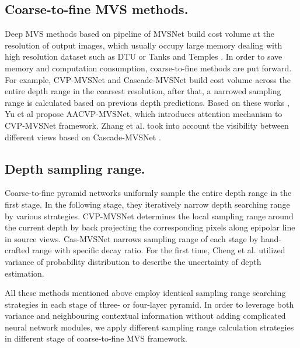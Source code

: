 \documentclass{article}
\begin{document}
\subsection{Coarse-to-fine MVS methods.}
Deep MVS methods \cite{yao2018mvsnet,yao2019recurrent} based on pipeline of MVSNet \cite{yao2018mvsnet} build cost volume at the resolution of output images, which usually occupy large memory dealing with high resolution dataset such as DTU \cite{aanaes2016large} or Tanks and Temples \cite{knapitsch2017tanks}.
In order to save memory and computation consumption, coarse-to-fine methods \cite{yu2020fast,yang2020cost,gu2020cascade}are put forward.
For example, CVP-MVSNet \cite{yang2020cost} and Cascade-MVSNet \cite{gu2020cascade} build cost volume across the entire depth range in the coarsest resolution, after that, a narrowed sampling range is calculated based on previous depth predictions.
Based on these works \cite{yang2020cost,gu2020cascade}, Yu et al \cite{yu2021attention} propose AACVP-MVSNet, which introduces attention mechanism to CVP-MVSNet \cite{yang2020cost} framework.
Zhang et al. \cite{zhang2020visibility} took into account the visibility between different views based on Cascade-MVSNet \cite{gu2020cascade}.

\subsection{Depth sampling range.}
Coarse-to-fine pyramid networks uniformly sample the entire depth range in the first stage.
In the following stage, they iteratively narrow depth searching range by various strategies.
CVP-MVSNet \cite{yang2020cost} determines the local sampling range around the current depth by back projecting the corresponding pixels along epipolar line in source views.
Cas-MVSNet \cite{gu2020cascade} narrows sampling range of each stage by hand-crafted range with specific decay ratio.
For the first time, Cheng et al. \cite{cheng2020deep} utilized variance of probability distribution to describe the uncertainty of depth estimation.

All these methods mentioned above employ identical sampling range searching strategies in each stage of three- or four-layer pyramid.
In order to leverage both variance and neighbouring contextual information without adding complicated neural network modules, we apply different sampling range calculation strategies in different stage of coarse-to-fine MVS framework.
\end{document}
